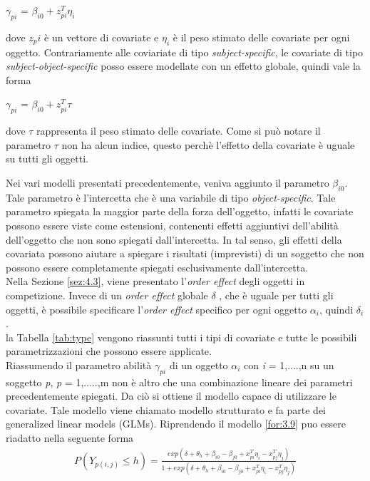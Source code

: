 \begin{itemize}
		\begin{center}
		$ \gamma_{pi}$ = $\beta_{i0} + z^{T}_{pi}\eta_i$
	\end{center}
		dove $z_pi$ è un vettore di covariate e $\eta_i$ è il peso stimato delle covariate per ogni oggetto. Contrariamente alle coviariate di tipo \emph{subject-specific}, le covariate di tipo \emph{subject-object-specific} posso essere modellate con un effetto globale, quindi vale la forma 
		\begin{center}
			$ \gamma_{pi}$ = $\beta_{i0} + z^{T}_{pi}\tau$
		\end{center}
	 dove $\tau$ rappresenta il peso stimato delle covariate. Come si può notare il parametro $\tau$ non ha alcun indice, questo perchè l'effetto della covariate è uguale su tutti gli oggetti.
\end{itemize}
Nei vari modelli presentati precedentemente, veniva aggiunto il parametro $\beta_{i0}$. Tale parametro è l'intercetta che è una variabile di tipo \emph{object-specific}. Tale parametro spiegata la maggior parte della forza dell'oggetto, infatti le covariate possono essere viste come estensioni, contenenti effetti aggiuntivi dell'abilità dell'oggetto che non sono spiegati dall'intercetta. In tal senso, gli effetti della covariata possono aiutare a spiegare i risultati (imprevisti) di un soggetto che non possono essere completamente spiegati esclusivamente dall'intercetta.\\
Nella Sezione \ref{sez:4.3}, viene presentato l'\emph{order effect} degli oggetti in competizione. Invece di un \emph{order effect} globale $\delta$ , che è uguale per tutti gli oggetti, è possibile specificare l'\emph{order effect} specifico per ogni oggetto $\alpha_i$, quindi $\delta_i$.\\
la Tabella \ref{tab:type} vengono riassunti tutti i tipi di covariate e tutte le possibili parametrizzazioni che possono essere applicate.\\
Riassumendo il parametro abilità  $\gamma_{pi}$ di un oggetto $\alpha_i$ con \emph{i} = 1,....,n su un soggetto \emph{p}, \emph{p} = 1,.....,m non è altro che una combinazione lineare dei parametri precedentemente spiegati. Da ciò si ottiene il modello capace di utilizzare le covariate. Tale modello viene chiamato modello strutturato e fa parte dei generalized linear models (GLMs). Riprendendo il modello \ref{for:3.9} puo essere riadatto nella seguente forma
\begin{align}
	P(Y_{p(i,j)}\leq h) =  \frac{exp(\delta + \theta_{h} + \beta_{i0} - \beta_{j0} + x^T_{pi}\eta_i - x^T_{pj}\eta_j)}{1 + exp(\delta + \theta_{h} + \beta_{i0} - \beta_{j0} + x^T_{pi}\eta_i - x^T_{pj}\eta_j)} \label{for:4.9}
\end{align}


